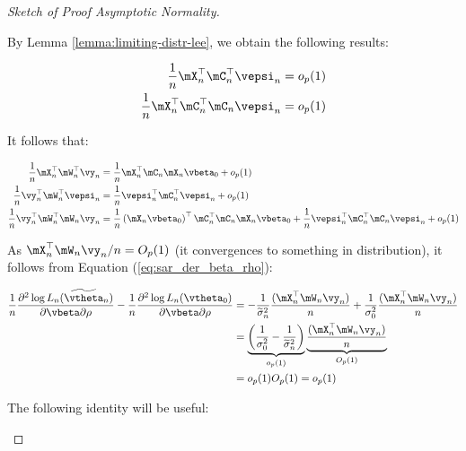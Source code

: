 \documentclass[english,12pt]{book}\usepackage[]{graphicx}\usepackage[]{xcolor}
\begin{document}
\begin{proof}[Sketch of Proof Asymptotic Normality]
\begin{enumerate}
  By Lemma \ref{lemma:limiting-distr-lee}, we obtain the following results:
   
   \begin{equation*}
    \begin{aligned}
      \frac{1}{n}\mX_n^\top\mC_n^\top\vepsi_n & =o_p(1) \\
      \frac{1}{n}\mX_n^\top\mC_n^\top\mC_n\vepsi_n & = o_p(1)
    \end{aligned}
   \end{equation*}
   
   It follows that:
   
   \begin{equation*}
    \begin{aligned}
      \frac{1}{n}\mX_n^\top\mW_n^\top\vy_n & = \frac{1}{n}\mX_n^\top\mC_n\mX_n\vbeta_0 + o_p(1) \\
      \frac{1}{n}\vy_n^{\top}\mW_n^{\top}\vepsi_n &= \frac{1}{n}\vepsi_n^\top\mC_n^{\top}\vepsi_n + o_p(1) \\
      \frac{1}{n}\vy_n^\top\mW_n^\top\mW_n\vy_n & = \frac{1}{n}\left(\mX_n\vbeta_0\right)^\top\mC_n^\top\mC_n\mX_n\vbeta_0 + \frac{1}{n}\vepsi_n^\top\mC_n^\top\mC_n\vepsi_n + o_p(1)
    \end{aligned}
   \end{equation*}
   
   
   As $\mX_n^\top\mW_n\vy_n /n = O_p(1)$ (it convergences to something in distribution), it follows from Equation (\ref{eq:sar_der_beta_rho}):
   
   \begin{equation*}
    \begin{aligned}
    \frac{1}{n}\frac{\partial^2 \log L_n(\widetilde{\vtheta}_n)}{\partial \vbeta \partial \rho} - \frac{1}{n}\frac{\partial^2 \log L_n(\vtheta_0)}{\partial \vbeta \partial \rho} & = - \frac{1}{\widetilde{\sigma}^2_n}\frac{(\mX^\top_n \mW_n\vy_n)}{n} + \frac{1}{\sigma^2_0}\frac{(\mX^\top_n \mW_n\vy_n)}{n} \\
    & = \underbrace{\left(\frac{1}{\sigma^2_0} - \frac{1}{\widetilde{\sigma}^2_n}\right)}_{o_p(1)}\underbrace{\frac{(\mX^\top_n \mW_n\vy_n)}{n}}_{O_p(1)} \\
    & = o_p(1)O_p(1)  = o_p(1)
    \end{aligned}
   \end{equation*} 
   
   The following identity will be useful:
   

\end{enumerate}
\end{proof}
\end{document}
